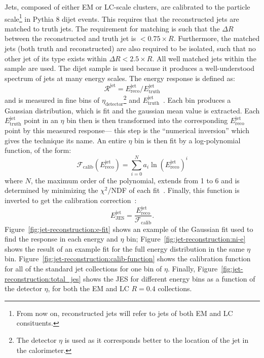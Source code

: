 Jets, composed of either EM or LC-scale clusters, are calibrated to the particle scale\footnote{From now on, reconstructed jets will refer to jets of both EM and LC consituents.} in Pythia 8 dijet events. This requires that the reconstructed jets are matched to truth jets. The requirement for matching is such that the $\Delta R$ between the reconstructed and truth jet is $<0.75\times R$. Furthermore, the matched jets (both truth and reconstructed) are also required to be isolated, such that no other jet of its type exists within $\Delta R < 2.5\times R$. All well matched jets within the sample are used. The dijet sample is used because it produces a well-understood spectrum of jets at many energy scales. The energy response is defined as:
%
\begin{equation}
\mathcal{R}^{\mathrm{jet}} = E^{\mathrm{jet}}_{\mathrm{reco}} /  E^{\mathrm{jet}}_{\mathrm{truth}} 
\end{equation}
%
and is measured in fine bins of $\eta_{\mathrm{detector}}$\footnote{The detector $\eta$ is used as it corresponds better to the location of the jet in the calorimeter.} and $E^{\mathrm{jet}}_{\mathrm{truth}}$~\cite{JES2010}. Each bin produces a Gaussian distribution, which is fit and the gaussian mean value is extracted. Each $E^{\mathrm{jet}}_{\mathrm{truth}}$ point in an $\eta$ bin then is then transformed into the corresponding $E^{\mathrm{jet}}_{\mathrm{reco}}$ point by this measured response--- this step is the ``numerical inversion'' which gives the technique its name. An entire $\eta$ bin is then fit by a log-polynomial function, of the form:
%
\begin{equation}
\mathcal{F}_\mathrm{calib}\left(E^{\mathrm{jet}}_{\mathrm{reco}}\right) = \sum_{i=0}^N a_i \ln \left( E^{\mathrm{jet}}_{\mathrm{reco}} \right)^i
\end{equation}
%
where $N$, the maximum order of the polynomial, extends from 1 to 6 and is determined by minimizing the $\chi^2/$NDF of each fit~\cite{JES2010}. Finally, this function is inverted to get the calibration correction~\cite{JES2010}:
%
\begin{equation}
E^{\mathrm{jet}}_{\mathrm{JES}} = \frac{E^{\mathrm{jet}}_{\mathrm{reco}}}{\mathcal{F}_\mathrm{calib}}.
\end{equation}
%
Figure~\ref{fig:jet-reconstruction:e-fit} shows an example of the Gaussian fit used to find the response in each energy and $\eta$ bin; Figure~\ref{fig:jet-reconstruction:ni-e} shows the result of an example fit for the full energy distribution in the same $\eta$ bin. Figure~\ref{fig:jet-reconstruction:calib-function} shows the calibration function for all of the standard jet collections for one bin of $\eta$. Finally, Figure~\ref{fig:jet-reconstruction:total_jes} shows the JES for different energy bins as a function of the detector $\eta$, for both the EM and LC $R=0.4$ collections.

